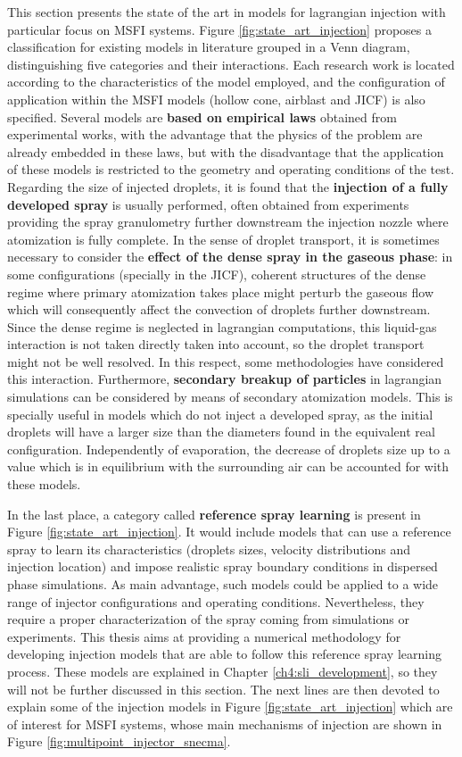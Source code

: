 This section presents the state of the art in models for lagrangian injection with particular focus on MSFI systems. Figure \ref{fig:state_art_injection} proposes a classification for existing models in literature grouped in a Venn diagram, distinguishing five categories and their interactions. Each research work is located according to the characteristics of the model employed, and the configuration of application within the MSFI models (hollow cone, airblast and JICF) is also specified. Several models are \textbf{based on empirical laws} obtained from experimental works, with the advantage that the physics of the problem are already embedded in these laws, but with the disadvantage that the application of these models is restricted to the geometry and operating conditions of the test. Regarding the size of injected droplets, it is found that the \textbf{injection of a fully developed spray} is usually performed, often obtained from experiments providing the spray granulometry further downstream the injection nozzle where atomization is fully complete. In the sense of droplet transport, it is sometimes necessary to consider the \textbf{effect of the dense spray in the gaseous phase}: in some configurations (specially in the JICF), coherent structures of the dense regime where primary atomization takes place might perturb the gaseous flow which will consequently affect the convection of droplets further downstream. Since the dense regime is neglected in lagrangian computations, this liquid-gas interaction is not taken directly taken into account, so the droplet transport might not be well resolved. In this respect, some methodologies have considered this interaction. Furthermore,  \textbf{secondary breakup of particles} in lagrangian simulations can be considered by means of secondary atomization models. This is specially useful in models which do not inject a developed spray, as the initial droplets will have a larger size than the diameters found in the equivalent real configuration. Independently of evaporation, the decrease of droplets size up to a value which is in equilibrium with the surrounding air can be accounted for with these models.

In the last place, a category called \textbf{reference spray learning} is present in Figure \ref{fig:state_art_injection}. It would include models that can use a reference spray to learn its characteristics (droplets sizes, velocity distributions and injection location) and impose realistic spray boundary conditions in dispersed phase simulations. As main advantage, such models could be applied to a wide range of injector configurations and operating conditions. Nevertheless, they require a proper characterization of the spray coming from simulations or experiments. This thesis aims at providing a numerical methodology for developing injection models that are able to follow this reference spray learning process. These models are explained in Chapter \ref{ch4:sli_development}, so they will not be further discussed in this section. The next lines are then devoted to explain some of the injection models in Figure \ref{fig:state_art_injection} which are of interest for MSFI systems, whose main mechanisms of injection are shown in Figure \ref{fig:multipoint_injector_snecma}.

